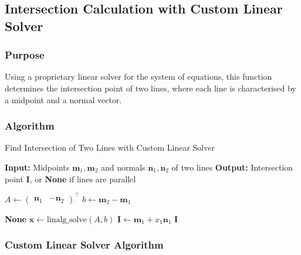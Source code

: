 \documentclass[12pt,a4paper]{report}
\begin{document}
\subsection{Intersection Calculation with Custom Linear Solver}

\subsubsection{Purpose}
Using a proprietary linear solver for the system of equations, this function determines the intersection point of two lines, where each line is characterised by a midpoint and a normal vector.

\subsubsection{Algorithm}

\begin{algorithm}
\caption{Find Intersection of Two Lines with Custom Linear Solver}
\begin{algorithmic}[1]
\State \textbf{Input:} Midpoints $\mathbf{m}_1, \mathbf{m}_2$ and normals $\mathbf{n}_1, \mathbf{n}_2$ of two lines
\State \textbf{Output:} Intersection point $\mathbf{I}$, or \textbf{None} if lines are parallel

\State $A \gets \begin{pmatrix} \mathbf{n}_1 & -\mathbf{n}_2 \end{pmatrix}^\top$
\State $b \gets \mathbf{m}_2 - \mathbf{m}_1$

    \State \Return \textbf{None}
\Else
    \State $\mathbf{x} \gets \text{linalg\_solve}(A, b)$
    \State $\mathbf{I} \gets \mathbf{m}_1 + x_1 \mathbf{n}_1$
    \State \Return $\mathbf{I}$
\EndIf
\end{algorithmic}
\end{algorithm}

\vspace*{\fill} \newpage

\subsubsection{Custom Linear Solver Algorithm}
\end{document}

